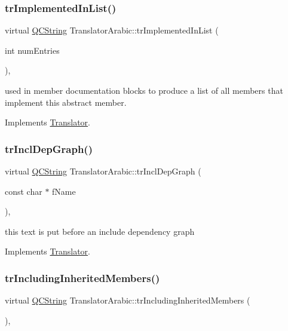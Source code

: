 \subsubsection{\texorpdfstring{trImplementedInList()}{trImplementedInList()}}
{\footnotesize\ttfamily virtual \mbox{\hyperlink{class_q_c_string}{Q\+C\+String}} Translator\+Arabic\+::tr\+Implemented\+In\+List (\begin{DoxyParamCaption}\item[{int}]{num\+Entries }\end{DoxyParamCaption})\hspace{0.3cm}{\ttfamily [inline]}, {\ttfamily [virtual]}}

used in member documentation blocks to produce a list of all members that implement this abstract member. 

Implements \mbox{\hyperlink{class_translator}{Translator}}.

\mbox{\label{class_translator_arabic_aaa2e9d86d62c6d0c529a4e4674ee93b0}} 
\subsubsection{\texorpdfstring{trInclDepGraph()}{trInclDepGraph()}}
{\footnotesize\ttfamily virtual \mbox{\hyperlink{class_q_c_string}{Q\+C\+String}} Translator\+Arabic\+::tr\+Incl\+Dep\+Graph (\begin{DoxyParamCaption}\item[{const char $\ast$}]{f\+Name }\end{DoxyParamCaption})\hspace{0.3cm}{\ttfamily [inline]}, {\ttfamily [virtual]}}

this text is put before an include dependency graph 

Implements \mbox{\hyperlink{class_translator}{Translator}}.

\mbox{\label{class_translator_arabic_af27177157cd20751ef1bfbb2ac8186cf}} 
\subsubsection{\texorpdfstring{trIncludingInheritedMembers()}{trIncludingInheritedMembers()}}
{\footnotesize\ttfamily virtual \mbox{\hyperlink{class_q_c_string}{Q\+C\+String}} Translator\+Arabic\+::tr\+Including\+Inherited\+Members (\begin{DoxyParamCaption}{ }\end{DoxyParamCaption})\hspace{0.3cm}{\ttfamily [inline]}, {\ttfamily [virtual]}}

